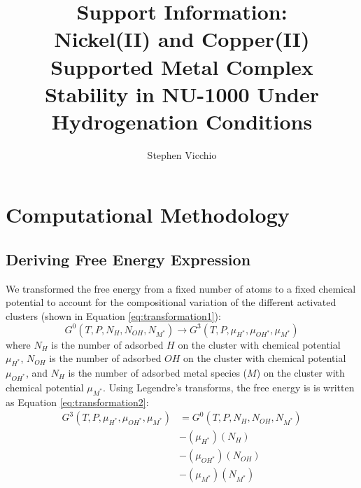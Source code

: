 \documentclass[12pt]{article}
\title{Support Information: \\
Nickel(II) and Copper(II) Supported Metal Complex Stability in NU-1000 Under Hydrogenation Conditions}
\author{Stephen Vicchio}
\begin{document}
\maketitle


\section{Computational Methodology}
\subsection{Deriving Free Energy Expression}
We transformed the free energy from a fixed number of atoms to a fixed chemical potential to account for the compositional variation of the different activated clusters (shown in Equation \ref{eq:transformation1}):
\begin{equation}
    G^{0}(T,P,N_{H},N_{OH},N_{M^{*}}) \rightarrow G^{3}(T,P,\mu_{H^{*}},\mu_{OH^{*}},\mu_{M^{*}})
    \label{eq:transformation1}
\end{equation}
where $N_{H}$ is the number of adsorbed $H$ on the cluster with chemical potential $\mu_{H^{*}}$, $N_{OH}$ is the number of adsorbed $OH$ on the cluster with chemical potential $\mu_{OH^{*}}$, and $N_{H}$ is the number of adsorbed metal species ($M$) on the cluster with chemical potential $\mu_{M^{*}}$. Using Legendre's transforms, the free energy is is written as Equation \ref{eq:transformation2}:
\begin{equation}
    \begin{split}
        G^{3}(T,P,\mu_{H^{*}},\mu_{OH^{*}},\mu_{M^{*}}) &= G^{0}(T,P,N_{H},N_{OH},N_{M^{*}}) \\ &- (\mu_{H^{*}})(N_{H}) \\ &- (\mu_{OH^{*}})(N_{OH}) \\ &- (\mu_{M^{*}})(N_{M^{*}})  
        \label{eq:transformation2}    
    \end{split}
\end{equation}
\end{document}
